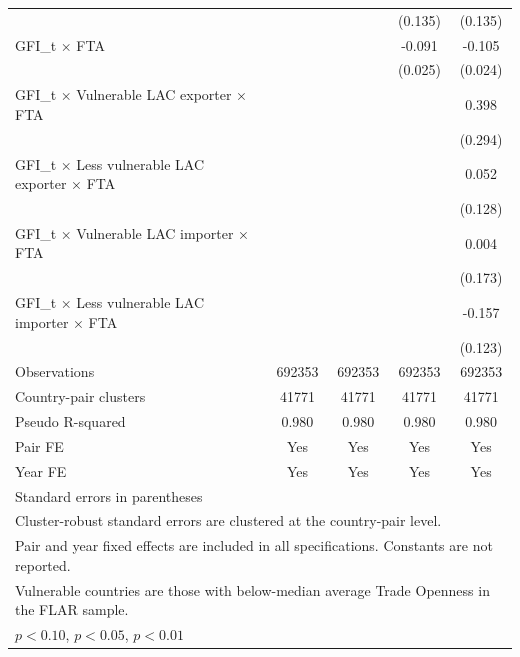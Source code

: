 \begin{table}[htbp]
\begin{tabular}{l*{4}{c}}
          &                  &                  &  (0.135)         &  (0.135)         \\
[1em]
GFI\_t × FTA&                  &                  &   -0.091\sym{***}&   -0.105\sym{***}\\
          &                  &                  &  (0.025)         &  (0.024)         \\
[1em]
GFI\_t × Vulnerable LAC exporter × FTA&                  &                  &                  &    0.398         \\
          &                  &                  &                  &  (0.294)         \\
[1em]
GFI\_t × Less vulnerable LAC exporter × FTA&                  &                  &                  &    0.052         \\
          &                  &                  &                  &  (0.128)         \\
[1em]
GFI\_t × Vulnerable LAC importer × FTA&                  &                  &                  &    0.004         \\
          &                  &                  &                  &  (0.173)         \\
[1em]
GFI\_t × Less vulnerable LAC importer × FTA&                  &                  &                  &   -0.157         \\
          &                  &                  &                  &  (0.123)         \\
\hline
Observations&   692353         &   692353         &   692353         &   692353         \\
Country-pair clusters&    41771         &    41771         &    41771         &    41771         \\
Pseudo R-squared&    0.980         &    0.980         &    0.980         &    0.980         \\
Pair FE   &      Yes         &      Yes         &      Yes         &      Yes         \\
Year FE   &      Yes         &      Yes         &      Yes         &      Yes         \\
\hline\hline
\multicolumn{5}{l}{\footnotesize Standard errors in parentheses}\\
\multicolumn{5}{l}{\footnotesize Cluster-robust standard errors are clustered at the country-pair level.}\\
\multicolumn{5}{l}{\footnotesize Pair and year fixed effects are included in all specifications. Constants are not reported.}\\
\multicolumn{5}{l}{\footnotesize Vulnerable countries are those with below-median average Trade Openness in the FLAR sample.}\\
\multicolumn{5}{l}{\footnotesize \sym{*} \(p<0.10\), \sym{**} \(p<0.05\), \sym{***} \(p<0.01\)}\\
\end{tabular}
\end{table}
